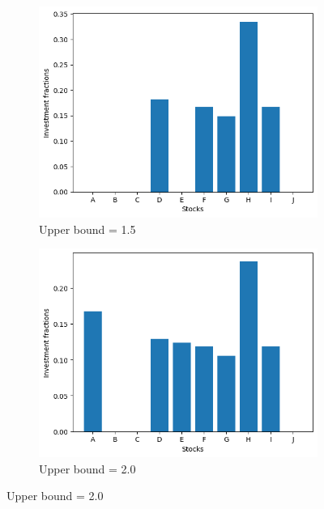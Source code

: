 \begin{figure}[H]
\begin{subfigure}{0.5\textwidth}
        \includegraphics[width=\textwidth]{lab12/imgs/norm_15.png}
        \caption{Upper bound = 1.5}
    \end{subfigure}
    \begin{subfigure}{0.5\textwidth}
        \includegraphics[width=\textwidth]{lab12/imgs/norm_20.png}
        \caption{Upper bound = 2.0}
    \end{subfigure}
    \label{fig:norm}
\end{figure}
